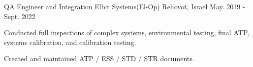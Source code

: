 \begin{cventries}
  \cventry
    {QA Engineer and Integration} %
    {Elbit Systems(El-Op)} %
    {Rehovot, Israel} %
    {May. 2019 - Sept. 2022} %
    {
      \begin{cvitems} %
         \item {Conducted full inspections of complex systems, environmental testing, final ATP, systems calibration, and calibration testing.}
         \item {Created and maintained ATP / ESS / STD / STR documents.}
      \end{cvitems}
    }

\end{cventries}


